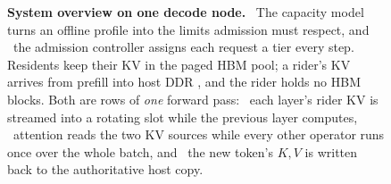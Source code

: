 \begin{figure}[t]
\begin{tikzpicture}[x=1cm,y=1cm]
\end{tikzpicture}
\caption{\textbf{System overview on one decode node.}
~The capacity model turns an offline profile into the limits admission
must respect, and ~the admission controller assigns each request a tier
every step. Residents keep their KV in the paged HBM pool; a rider's KV arrives
from prefill into host DDR , and the rider holds no HBM blocks. Both are
rows of \emph{one} forward pass: ~each layer's rider KV is streamed into
a rotating slot while the previous layer computes, ~attention reads the
two KV sources while every other operator runs once over the whole batch, and
~the new token's $K,V$ is written back to the authoritative host copy.}
\label{fig:overview}
\end{figure}

